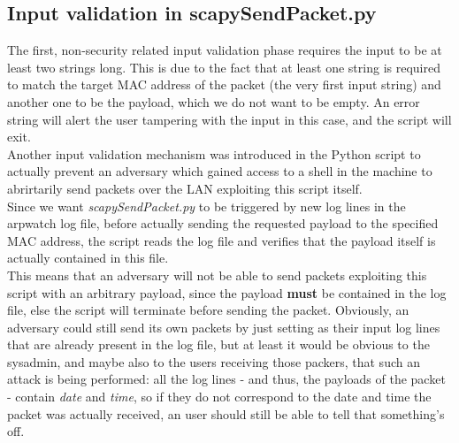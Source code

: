 \subsection{Input validation in scapySendPacket.py}
The first, non-security related input validation phase requires the input to be at least two strings long. This is due to the fact that at least one string is required to match the target MAC address of the packet (the very first input string) and another one to be the payload, which we do not want to be empty. An error string will alert the user tampering with the input in this case, and the script will exit.\\
Another input validation mechanism was introduced in the Python script to actually prevent an adversary which gained access to a shell in the machine to abrirtarily send packets over the LAN exploiting this script itself.\\
Since we want \textit{scapySendPacket.py} to be triggered by new log lines in the arpwatch log file, before actually sending the requested payload to the specified MAC address, the script reads the log file and verifies that the payload itself is actually contained in this file.\\
This means that an adversary will not be able to send packets exploiting this script with an arbitrary payload, since the payload \textbf{must} be contained in the log file, else the script will terminate before sending the packet. Obviously, an adversary could still send its own packets by just setting as their input log lines that are already present in the log file, but at least it would be obvious to the sysadmin, and maybe also to the users receiving those packers, that such an attack is being performed: all the log lines - and thus, the payloads of the packet - contain \textit{date} and \textit{time}, so if they do not correspond to the date and time the packet was actually received, an user should still be able to tell that something's off.
